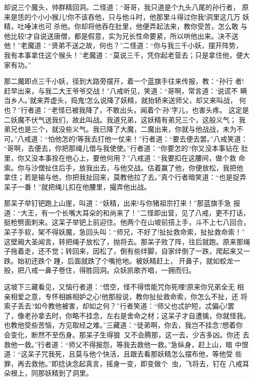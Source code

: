 却说三个魔头，帅群精回洞。二怪道：“哥哥，我只道是个九头八尾的孙行者，
原来是恁的个小小猴儿!你不该吞他，只与他斗时，他那里斗得过你我!洞里这几万
妖精，吐唾沫也可杀他。你却将他吞在肚里，他便弄起法来，教你受苦，怎么敢
与他比较!才自说送唐僧，都是假意，实为兄长性命要紧，所以哄他出来。决不送
他！”老魔道：“贤弟不送之故，何也？”二怪道：“你与我三千小妖，摆开阵势，
我有本事拿住这个猴头！”老魔道：“莫说三千，凭你起老营去；只是拿住他，便大
家有功。”

那二魔即点三千小妖，径到大路旁摆开，着一个蓝旗手往来传报，教：“孙行
者!赶早出来，与我二大王爷爷交战！”八戒听见，笑道：“哥啊，常言道：‘说谎不
瞒当乡人。’就来弄虚头，捣鬼!怎么说降了妖精，就抬轿来送师父，却又来叫战，
何也？”行者道：“老怪已被我降了，不敢出头，闻着个‘孙’字儿，也害头疼。
这定是二妖魔不伏气送我们，故此叫战。我道兄弟，这妖精有弟兄三个，这般义气；
我弟兄也是三个，就没些义气。我已降了大魔，二魔出来，你就与他战战，未为不
可。”八戒道：“怕他怎的!等我去打他一仗来！”行者道：“要去便去罢。”八戒笑道：
“哥啊，去便去，你把那绳儿借与我使使。”行者道：“你要怎的?你又没本事钻在
肚里，你又没本事拴在他心上，要他何用？”八戒道：“我要扣在这腰间，做个救
命索。你与沙僧扯住后手，放我出去，与他交战。估着赢了他，你便放松，我把他
拿住；若是输与他，你把我扯回来，莫教他拉了去。”真个行者暗笑道：“也是捉弄
呆子一番！”就把绳儿扣在他腰里，撮弄他出战。

那呆子举钉钯跑上山崖，叫道：“妖精，出来!与你猪祖宗打来！”那蓝旗手急
报道：“大王，有一个长嘴大耳朵的和尚来了！”二怪即出营，见了八戒，更不打话，
挺枪劈面刺来。这呆子举钯上前迎住。他两个在山坡前搭上手，斗不上七八回合，
呆子手软，架不得妖魔，急回头叫：“师兄，不好了!扯扯救命索，扯扯救命索！”
这壁厢大圣闻言，转把绳子放松了，抛将去。那呆子败了阵，往后就跑。原来那绳
子拖着走，还不觉；转回来，因松了，倒有些绊脚，自家绊倒了一跌，爬起来又一
跌。始初还跌个踵，后面就跌了个嘴抢地。被妖精赶上，开鼻子，就如蛟龙一
般，把八戒一鼻子卷住，得胜回洞。众妖凯歌齐唱，一拥而归。

这坡下三藏看见，又恼行者道：“悟空，怪不得悟能咒你死哩!原来你兄弟全无
相亲相爱之意，专怀相嫉相妒之心!他那般说，教你扯扯救命索，你怎么不扯，还
将索子丢去?如今教他被害，却如之何？”行者笑道：“师父也忒护短，忒偏心!罢
了，像老孙拿去时，你略不挂念，左右是舍命之材；这呆子才自遭擒，你就怪我。
也教他受些苦恼，方见取经之难。”三藏道：“徒弟啊，你去，我岂不挂念?想着你
会变化，断然不至伤身。那呆子生得狼，又不会腾那，这一去，少吉多凶。你还
去救他一救。”行者道：“师父不得报怨，等我去救他一救。”急纵身，赶上山，暗
中恨道：“这呆子咒我死，且莫与他个快活，且跟去看那妖精怎么摆布他，等他受
些罪，再去救他。”即捻诀念起真言，摇身一变，即变做个虫，飞将去，钉在
八戒耳朵根上，同那妖精到了洞里。

